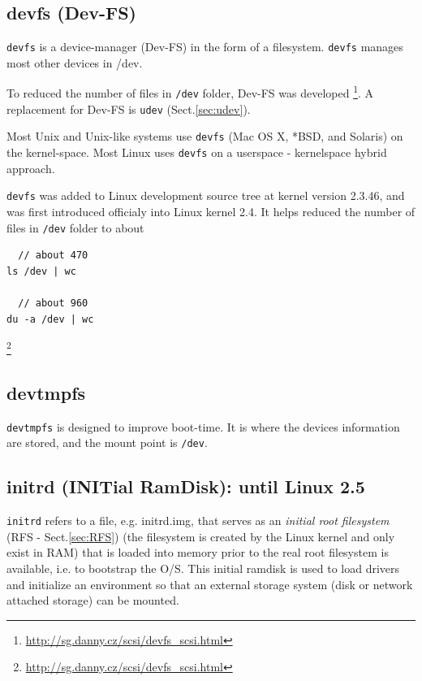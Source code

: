 \subsection{devfs (Dev-FS)}
\label{sec:devfs}

\verb!devfs! is a device-manager (Dev-FS) in the form of a filesystem.
\verb!devfs! manages most other devices in /dev. 

To reduced the number of files in \verb!/dev! folder, Dev-FS was developed
\footnote{\url{http://sg.danny.cz/scsi/devfs_scsi.html}}. A replacement for
Dev-FS is \verb!udev! (Sect.\ref{sec:udev}).

Most Unix and Unix-like systems use \verb!devfs! (Mac OS X, *BSD, and Solaris)
on the kernel-space. Most Linux uses \verb!devfs! on a userspace - kernelspace
hybrid approach.

\verb!devfs! was added to Linux development source tree at kernel version
2.3.46, and was first introduced officialy into Linux kernel 2.4. It helps
reduced the number of files in \verb!/dev! folder to about

\begin{verbatim}
  // about 470
ls /dev | wc 

  // about 960  
du -a /dev | wc  
\end{verbatim}
\footnote{\url{http://sg.danny.cz/scsi/devfs_scsi.html}}




\subsection{devtmpfs}
\label{{sec:devtmpfs}}

\verb!devtmpfs! is designed to improve boot-time. 
It is where the devices information are stored, and the mount point is
\verb!/dev!.

\subsection{initrd  (INITial RamDisk): until Linux 2.5}
\label{sec:initrd}

\verb!initrd! refers to a file, e.g. initrd.img, that serves as an {\it initial
root filesystem} (RFS - Sect.\ref{sec:RFS}) (the filesystem is created by the
Linux kernel and only exist in RAM) that is loaded into memory prior to the real
root filesystem is available, i.e.
to bootstrap the O/S. This initial ramdisk is used to load drivers and
initialize an environment so that an external storage system (disk or network
attached storage) can be mounted.

